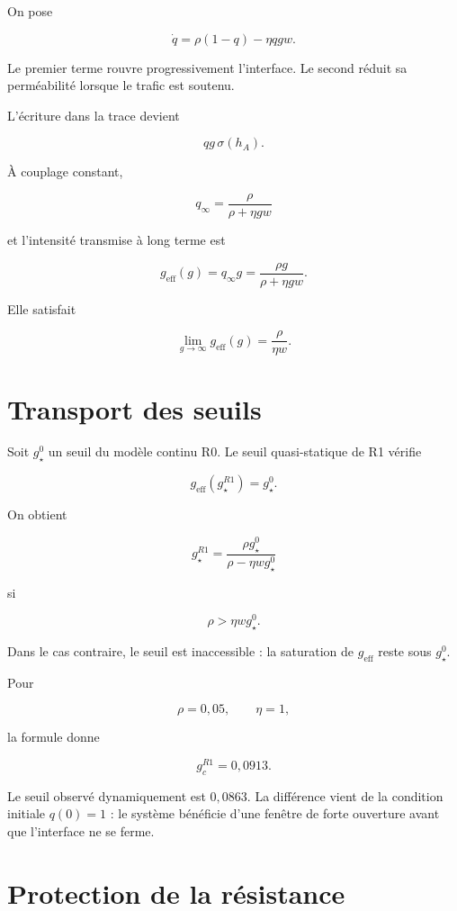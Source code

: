On pose

\[
\dot q
=
\rho(1-q)
-
\eta qgw.
\]

Le premier terme rouvre progressivement l'interface. Le second réduit sa
perméabilité lorsque le trafic est soutenu.

L'écriture dans la trace devient

\[
qg\,\sigma(h_A).
\]

À couplage constant,

\[
q_\infty
=
\frac{\rho}{\rho+\eta gw}
\]

et l'intensité transmise à long terme est

\[
\boxed{
g_{\mathrm{eff}}(g)
=
q_\infty g
=
\frac{\rho g}{\rho+\eta gw}
}.
\]

Elle satisfait

\[
\lim_{g\to\infty}g_{\mathrm{eff}}(g)
=
\frac{\rho}{\eta w}.
\]

\section{Transport des seuils}\label{t2-transport-des-seuils}

Soit \(g_\star^0\) un seuil du modèle continu R0. Le seuil
quasi-statique de R1 vérifie

\[
g_{\mathrm{eff}}(g_\star^{R1})=g_\star^0.
\]

On obtient

\[
\boxed{
g_\star^{R1}
=
\frac{\rho g_\star^0}
{\rho-\eta w g_\star^0}
}
\]

si

\[
\rho>\eta w g_\star^0.
\]

Dans le cas contraire, le seuil est inaccessible : la saturation de
\(g_{\mathrm{eff}}\) reste sous \(g_\star^0\).

Pour

\[
\rho=0{,}05,
\qquad
\eta=1,
\]

la formule donne

\[
g_c^{R1}=0{,}0913.
\]

Le seuil observé dynamiquement est \(0{,}0863\). La différence vient de
la condition initiale \(q(0)=1\) : le système bénéficie d'une fenêtre de
forte ouverture avant que l'interface ne se ferme.

\section{Protection de la résistance}\label{t2-protection-de-la-resistance}

